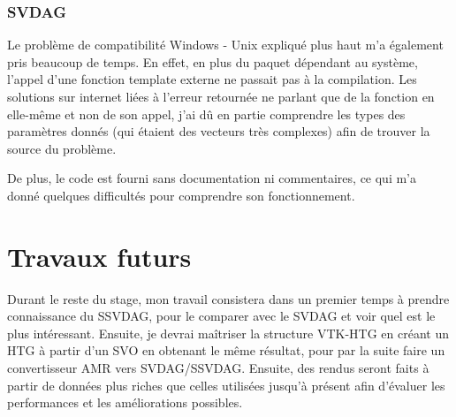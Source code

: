\documentclass[12pt,a4paper,twoside]{article}
\begin{document}
    \subsubsection{SVDAG}

    Le problème de compatibilité Windows - Unix expliqué plus haut m'a également pris beaucoup de temps. En effet, en plus du paquet dépendant au système,
    l'appel d'une fonction template externe ne passait pas à la compilation. Les solutions sur internet liées à l'erreur
    retournée ne parlant que de la fonction en elle-même et non de son appel, j'ai dû en partie comprendre les types des
    paramètres donnés (qui étaient des vecteurs très complexes) afin de trouver la source du problème.

    De plus, le code est fourni sans documentation ni commentaires, ce qui m'a donné quelques difficultés pour
    comprendre son fonctionnement.

    \newpage
    \section{Travaux futurs}

    Durant le reste du stage, mon travail consistera dans un premier temps à prendre connaissance du SSVDAG, pour le
    comparer avec le SVDAG et voir quel est le plus intéressant. Ensuite, je devrai maîtriser la structure VTK-HTG en créant un
    HTG à partir d'un SVO en obtenant le même résultat, pour par la suite faire un convertisseur AMR vers SVDAG/SSVDAG.
    Ensuite, des rendus seront faits à partir de données plus riches que celles utilisées jusqu'à présent afin d'évaluer les performances et
    les améliorations possibles.

    \begin{figure}[H]
    \end{figure}
\end{document}
